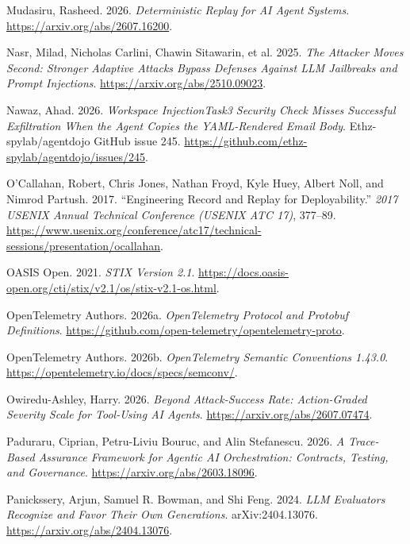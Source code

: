 \documentclass[
  american,
  10pt,
  a4paper,
]{article}
\newlength{\cslhangindent}
\newenvironment{CSLReferences}[2] %
 {\begin{list}{}{%
  \setlength{\itemindent}{0pt}
  \setlength{\leftmargin}{0pt}
  \setlength{\parsep}{0pt}
  \ifodd #1
   \setlength{\leftmargin}{\cslhangindent}
   \setlength{\itemindent}{-1\cslhangindent}
  \fi
  \setlength{\itemsep}{#2\baselineskip}}}
 {\end{list}}
\begin{document}
\begin{CSLReferences}{1}{1}
Mudasiru, Rasheed. 2026. \emph{Deterministic Replay for AI Agent
Systems}. \url{https://arxiv.org/abs/2607.16200}.

Nasr, Milad, Nicholas Carlini, Chawin Sitawarin, et al. 2025. \emph{The
Attacker Moves Second: Stronger Adaptive Attacks Bypass Defenses Against
{LLM} Jailbreaks and Prompt Injections}.
\url{https://arxiv.org/abs/2510.09023}.

Nawaz, Ahad. 2026. \emph{Workspace {InjectionTask3} Security Check
Misses Successful Exfiltration When the Agent Copies the {YAML}-Rendered
Email Body}. Ethz-spylab/agentdojo GitHub issue 245.
\url{https://github.com/ethz-spylab/agentdojo/issues/245}.

O'Callahan, Robert, Chris Jones, Nathan Froyd, Kyle Huey, Albert Noll,
and Nimrod Partush. 2017. {``Engineering Record and Replay for
Deployability.''} \emph{2017 USENIX Annual Technical Conference (USENIX
ATC 17)}, 377--89.
\url{https://www.usenix.org/conference/atc17/technical-sessions/presentation/ocallahan}.

OASIS Open. 2021. \emph{STIX Version 2.1}.
\url{https://docs.oasis-open.org/cti/stix/v2.1/os/stix-v2.1-os.html}.

OpenTelemetry Authors. 2026a. \emph{OpenTelemetry Protocol and Protobuf
Definitions}.
\url{https://github.com/open-telemetry/opentelemetry-proto}.

OpenTelemetry Authors. 2026b. \emph{OpenTelemetry Semantic Conventions
1.43.0}. \url{https://opentelemetry.io/docs/specs/semconv/}.

Owiredu-Ashley, Harry. 2026. \emph{Beyond Attack-Success Rate:
Action-Graded Severity Scale for Tool-Using {AI} Agents}.
\url{https://arxiv.org/abs/2607.07474}.

Paduraru, Ciprian, Petru-Liviu Bouruc, and Alin Stefanescu. 2026.
\emph{A Trace-Based Assurance Framework for Agentic AI Orchestration:
Contracts, Testing, and Governance}.
\url{https://arxiv.org/abs/2603.18096}.

Panickssery, Arjun, Samuel R. Bowman, and Shi Feng. 2024. \emph{{LLM}
Evaluators Recognize and Favor Their Own Generations}. arXiv:2404.13076.
\url{https://arxiv.org/abs/2404.13076}.


\end{CSLReferences}
\end{document}
